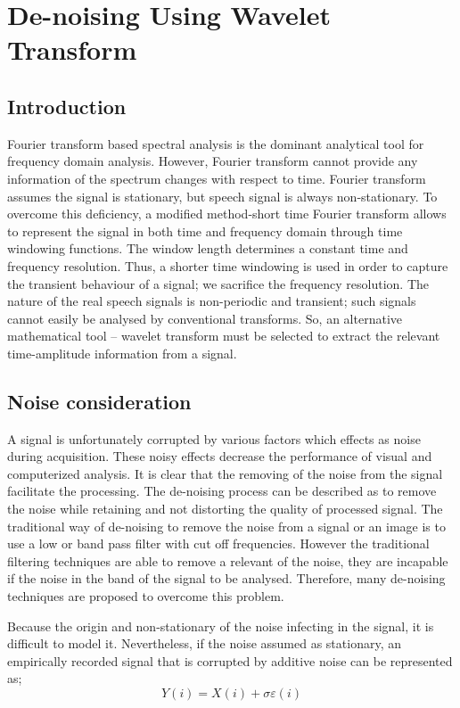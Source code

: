 \documentclass[12pt, a4paper, twoside]{report}
\begin{document}
\section{De-noising Using Wavelet Transform}
\subsection{Introduction}
Fourier transform based spectral analysis is the dominant analytical tool for frequency domain analysis. However, Fourier transform cannot provide any information of the spectrum changes with respect to time. Fourier transform assumes the signal is stationary, but speech signal is always non-stationary. To overcome this deficiency, a modified method-short time Fourier transform allows to represent the signal in both time and frequency domain through time windowing functions. The window length determines a constant time and frequency resolution. Thus, a shorter time windowing is used in order to capture the transient behaviour of a signal; we sacrifice the frequency resolution. The nature of the real speech signals is non-periodic and transient; such signals cannot easily be analysed by conventional transforms. So, an alternative mathematical tool – wavelet transform must be selected to extract the relevant time-amplitude information from a signal.
\subsection{Noise consideration}
A signal is unfortunately corrupted by various factors which effects as noise during acquisition. These noisy effects decrease the performance of visual and computerized analysis. It is clear that the removing of the noise from the signal facilitate the processing. The de-noising process can be described as to remove the noise while retaining and not distorting the quality of processed signal. The traditional way of de-noising to remove the noise from a signal or an image is to use a low or band pass filter with cut off frequencies. However the traditional filtering techniques are able to remove a relevant of the noise, they are incapable if the noise in the band of the signal to be analysed. Therefore, many de-noising techniques are proposed to overcome this problem.
\par
Because the origin and non-stationary of the noise infecting in  the signal, it is difficult to model it. Nevertheless, if the noise assumed as stationary, an empirically recorded signal that is corrupted by additive noise can be represented as;
\begin{equation*}
Y(i) = X(i) + \sigma \varepsilon(i)
\end{equation*}
\end{document}
